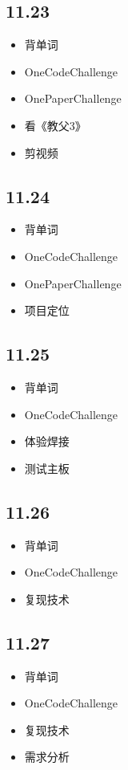 \documentclass[UTF8]{ctexart}
\begin{document}
\subsection*{11.23}
\begin{itemize}
    \item 背单词
    \item OneCodeChallenge
    \item OnePaperChallenge
    \item 看《教父3》
    \item 剪视频
\end{itemize}

\subsection*{11.24}
\begin{itemize}
    \item 背单词
    \item OneCodeChallenge
    \item OnePaperChallenge
    \item 项目定位
\end{itemize}

\subsection*{11.25}
\begin{itemize}
    \item 背单词
    \item OneCodeChallenge
    \item 体验焊接
    \item 测试主板
\end{itemize}

\subsection*{11.26}
\begin{itemize}
    \item 背单词
    \item OneCodeChallenge
    \item 复现技术
\end{itemize}

\subsection*{11.27}
\begin{itemize}
    \item 背单词
    \item OneCodeChallenge
    \item 复现技术
    \item 需求分析
\end{itemize}
\end{document}
